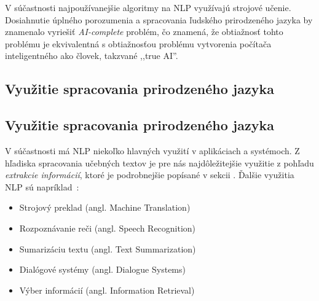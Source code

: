 V súčastnosti najpoužívanejšie algoritmy na NLP využívajú strojové učenie. Dosiahnutie úplného porozumenia a spracovania ľudského prirodzeného jazyka by znamenalo vyriešiť \textit{AI-complete} problém, čo znamená, že obtiažnosť tohto problému je ekvivalentná s obtiažnosťou problému vytvorenia počítača inteligentného ako človek, takzvané ,,true AI''.

%
%
{
	\subsection{Využitie spracovania prirodzeného jazyka}
}
{
	\subsection{Využitie spracovania prirodzeného jazyka}
}
\label{subsec:useofnlp}
V súčastnosti má NLP niekoľko hlavných využití v aplikáciach a systémoch. Z hľadiska spracovania učebných textov je pre nás najdôležitejšie využitie z pohľadu \textit{extrakcie informácií}, ktoré je podrobnejšie popísané v sekcii . Ďalšie využitia NLP sú napríklad~\cite{Preeti}:
\begin{itemize}
	\item Strojový preklad (angl. Machine Translation)
	\item Rozpoznávanie reči (angl. Speech Recognition)
	\item Sumarizáciu textu (angl. Text Summarization)
	\item Dialógové systémy (angl. Dialogue Systems)
	\item Výber informácií (angl. Information Retrieval)
\end{itemize}

